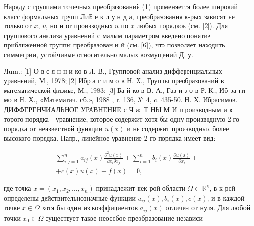 \documentclass[10pt]{article}
\begin{document}
Наряду с группами точечных преобразований (1) применяется более широкий класс формальных групп ЛиБ е к л у н д а, преобразования к-рых зависят не только от $x$, $u$, но и от производных $u$ по $x$ любых порядков (см. [2]). Для группового анализа уравнений с малым параметром введено понятие приближенной группы преобразован и й (см. [6]), что позволяет находить симметрии, устойчивые относительно малых возмущений Д. у.



Лum.: [1] О в с я н н и ко в Л. В., Групповой анализ дифференциальных уравнений, М., 1978; [2] Ибр а г и м о в Н. Х., Группы преобразований в математической физике, М., 1983; [3] Ба й ко в В. А., Газ и з о в Р. К., Иб ра ги мо в Н. Х., «Математич. сб.», 1988 , т. 136, № 4, c. 435-50. Н. Х. Ибрасимов. ДИФФЕРЕНЧИАЛЬНОЕ УРАВНЕНИЕ с Ч ас Т НЫ М И п роизводным и в торого порядка - уравнение, которое содержит хотя бы одну производную 2-го порядка от неизвестной функции $u(x)$ и не содержит производных более высокого порядка. Напр., линейное уравнение 2-го порядка имеет вид:



\[

\begin{gathered}

\sum_{i, j=1}^{n} a_{i j}(x) \frac{\partial^{2} u(x)}{\partial x_{i} \partial x_{j}}+\sum_{i=1}^{n} b_{i}(x) \frac{\partial u(x)}{\partial x_{i}}+ \\

+c(x) u(x)+f(x)=0,

\end{gathered}

\]



где точка $x=\left(x_{1}, x_{2}, \ldots, x_{n}\right)$ принадлежит нек-рой области $\Omega \subset \mathbb{R}^{n}$, в к-рой определены действительнозначные функции $a_{i j}(x), b_{i}(x), c(x)$, и в каждой точке $x \in \Omega$ хотя бы один из коэффициентов $a_{i j}(x)$ отличен от нуля. Для любой точки $x_{0} \in \Omega$ существует такое неособое преобразование независи-
\end{document}
